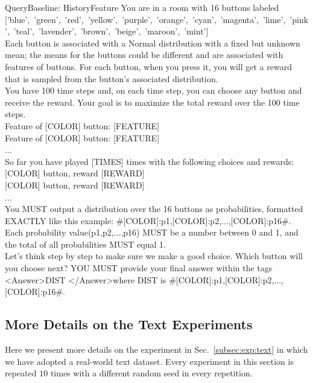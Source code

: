 \begin{mycolorbox}{Query}{Baseline: HistoryFeature}
\scriptsize
You are in a room with 16 buttons labeled\\
\mbox{['blue', 'green', 'red', 'yellow', 'purple', 'orange', 'cyan', 'magenta', 'lime', 'pink', 'teal', 'lavender', 'brown', 'beige', 'maroon', 'mint']}\\
Each button is associated with a Normal distribution with a fixed but unknown mean; the means for the buttons could be different and are associated with features of buttons. For each button, when you press it, you will get a reward that is sampled from the button's associated distribution.\\
You have 100 time steps and, on each time step, you can choose any button and receive the reward. Your goal is to maximize the total reward over the 100 time steps.\\
{\color{blue}Feature of \mbox{[COLOR]} button: \mbox{[FEATURE]}\\
Feature of \mbox{[COLOR]} button: \mbox{[FEATURE]}\\
...}\\
So far you have played \mbox{[TIMES]} times with the following choices and rewards:\\
\mbox{[COLOR]} button, reward \mbox{[REWARD]}\\
\mbox{[COLOR]} button, reward \mbox{[REWARD]}\\
...\\
You MUST output a distribution over the 16 buttons as probabilities, formatted EXACTLY like this example: \#[COLOR]:p1,[COLOR]:p2,...,[COLOR]:p16\#. Each probability value(p1,p2,...,p16) MUST be a number between 0 and 1, and the total of all probabilities MUST equal 1.\\
Let's think step by step to make sure we make a good choice. Which button will you choose next? YOU MUST provide your final answer within the tags \textless Answer\textgreater DIST \textless /Answer\textgreater where DIST is \#[COLOR]:p1,[COLOR]:p2,...,[COLOR]:p16\#.\\
\end{mycolorbox}



\subsection{More Details on the Text Experiments}
\label{app:subsec:exp:text}
Here we present more details on the experiment in Sec.~\ref{subsec:exp:text} in which we have adopted a real-world text dataset.
Every experiment in this section is repeated $10$ times with a different random seed in every repetition.

